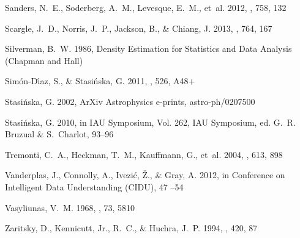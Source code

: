 \documentclass{emulateapj} \usepackage{amsmath} \usepackage{float}
\begin{document}
\begin{thebibliography}{}
{Sanders}, N.~E., {Soderberg}, A.~M., {Levesque}, E.~M., {et~al.} 2012, \apj,
  758, 132

{Scargle}, J.~D., {Norris}, J.~P., {Jackson}, B., \& {Chiang}, J. 2013, \apj,
  764, 167

Silverman, B.~W. 1986, Density Estimation for Statistics and Data Analysis
  (Chapman and Hall)

{Sim{\'o}n-D{\'{\i}}az}, S., \& {Stasi{\'n}ska}, G. 2011, \aap, 526, A48+

{Stasi{\'n}ska}, G. 2002, ArXiv Astrophysics e-prints, astro-ph/0207500

{Stasi{\'n}ska}, G. 2010, in IAU Symposium, Vol. 262, IAU Symposium, ed. G.~R.
  {Bruzual} \& S.~{Charlot}, 93--96

{Tremonti}, C.~A., {Heckman}, T.~M., {Kauffmann}, G., {et~al.} 2004, \apj, 613,
  898

{Vanderplas}, J., {Connolly}, A., {Ivezi{\'c}}, {\v Z}., \& {Gray}, A. 2012, in
  Conference on Intelligent Data Understanding (CIDU), 47 --54

{Vasyliunas}, V.~M. 1968, \jgr, 73, 5810

{Zaritsky}, D., {Kennicutt}, Jr., R.~C., \& {Huchra}, J.~P. 1994, \apj, 420, 87

\end{thebibliography}
\end{document}

